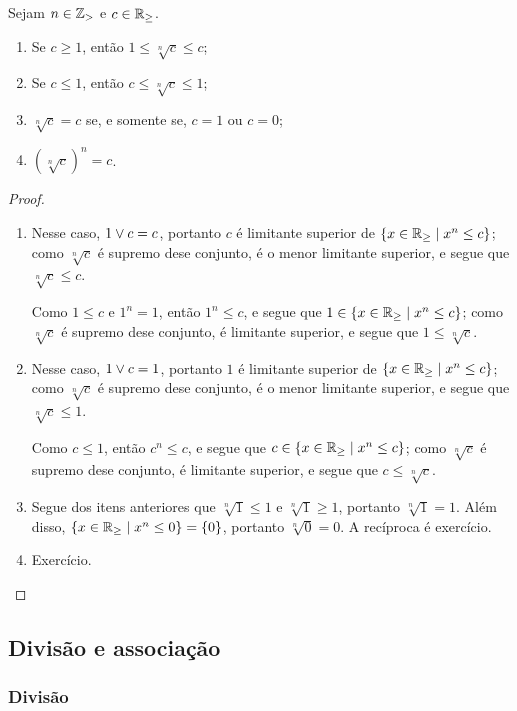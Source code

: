 \begin{proposition}
Sejam $n \in \mathbb{Z}_{>}$ e $c \in \mathbb{R}_{\geq}$.
	\begin{enumerate}
	\item Se $c \geq 1$, então $1 \leq \sqrt[n]{c} \leq c$;
	\item Se $c \leq 1$, então $c \leq \sqrt[n]{c} \leq 1$;
	\item $\sqrt[n]{c} = c$ se, e somente se, $c=1$ ou $c=0$;
	\item $(\sqrt[n]{c})^n = c$.
	\end{enumerate}
\end{proposition}
\begin{proof}
	\begin{enumerate}
	\item Nesse caso, $1 \mathbin{\vee} c = c$, portanto $c$ é limitante superior de $\left\{{x \in \mathbb{R}_{\geq}}\;\middle\vert\;{x^n \leq c}\right\}$; como $\sqrt[n]{c}$ é supremo dese conjunto, é o menor limitante superior, e segue que $\sqrt[n]{c} \leq c$.

	Como $1 \leq c$ e $1^n = 1$, então $1^n \leq c$, e segue que $1 \in \left\{{x \in \mathbb{R}_{\geq}}\;\middle\vert\;{x^n \leq c}\right\}$; como $\sqrt[n]{c}$ é supremo dese conjunto, é limitante superior, e segue que $1 \leq \sqrt[n]{c}$.

	\item Nesse caso, $1 \mathbin{\vee} c = 1$, portanto $1$ é limitante superior de $\left\{{x \in \mathbb{R}_{\geq}}\;\middle\vert\;{x^n \leq c}\right\}$; como $\sqrt[n]{c}$ é supremo dese conjunto, é o menor limitante superior, e segue que $\sqrt[n]{c} \leq 1$.

	Como $c \leq 1$, então $c^n \leq c$, e segue que $c \in \left\{{x \in \mathbb{R}_{\geq}}\;\middle\vert\;{x^n \leq c}\right\}$; como $\sqrt[n]{c}$ é supremo dese conjunto, é limitante superior, e segue que $c \leq \sqrt[n]{c}$.

	\item Segue dos itens anteriores que $\sqrt[n]{1} \leq 1$ e $\sqrt[n]{1} \geq 1$, portanto $\sqrt[n]{1} = 1$. Além disso, $\left\{{x \in \mathbb{R}_{\geq}}\;\middle\vert\;{x^n \leq 0}\right\} = \{0\}$, portanto $\sqrt[n]{0} = 0$. A recíproca é exercício.

	\item Exercício.
	\end{enumerate}
\end{proof}


\subsection{Divisão e associação}

\subsubsection{Divisão}

